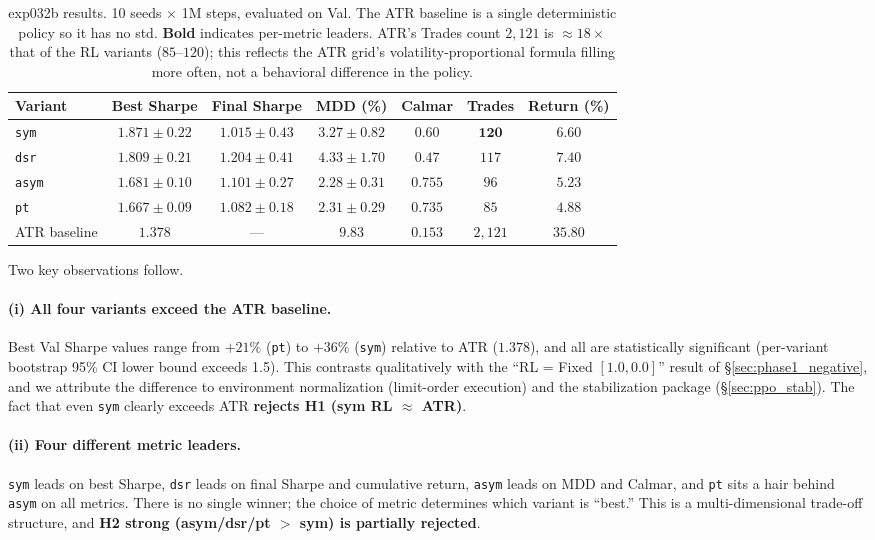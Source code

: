 \documentclass[11pt, a4paper]{article}
\begin{document}
\begin{table}[!htbp]
\centering
\small
\caption{exp032b results. 10 seeds $\times$ 1M steps, evaluated on Val. The
ATR baseline is a single deterministic policy so it has no std.
\textbf{Bold} indicates per-metric leaders. ATR's Trades count $2{,}121$ is
$\approx 18\times$ that of the RL variants ($85$--$120$); this reflects the
ATR grid's volatility-proportional formula filling more often, not a
behavioral difference in the policy.}
\begin{tabular}{lcccccc}
\toprule
Variant & Best Sharpe & Final Sharpe & MDD (\%) & Calmar & Trades & Return (\%) \\
\midrule
\texttt{sym}  & $\mathbf{1.871 \pm 0.22}$ & $1.015 \pm 0.43$ & $3.27 \pm 0.82$ &
$0.60$ & $\mathbf{120}$ & $6.60$ \\
\texttt{dsr}  & $1.809 \pm 0.21$ & $\mathbf{1.204 \pm 0.41}$ & $4.33 \pm 1.70$ &
$0.47$ & $117$ & $\mathbf{7.40}$ \\
\texttt{asym} & $1.681 \pm 0.10$ & $1.101 \pm 0.27$ & $\mathbf{2.28 \pm 0.31}$ &
$\mathbf{0.755}$ & $96$ & $5.23$ \\
\texttt{pt}   & $1.667 \pm 0.09$ & $1.082 \pm 0.18$ & $2.31 \pm 0.29$ &
$0.735$ & $85$ & $4.88$ \\
\midrule
ATR baseline & $1.378$ & --- & $9.83$ & $0.153$ & $2{,}121$ & $35.80$ \\
\bottomrule
\end{tabular}
\label{tab:pareto_metrics}
\end{table}

Two key observations follow.

\paragraph{(i) All four variants exceed the ATR baseline.}
Best Val Sharpe values range from $+21\%$ (\texttt{pt}) to $+36\%$ (\texttt{sym})
relative to ATR ($1.378$), and all are statistically significant
(per-variant bootstrap 95\% CI lower bound exceeds 1.5). This contrasts
qualitatively with the ``RL = Fixed $[1.0, 0.0]$'' result of
\S\ref{sec:phase1_negative}, and we attribute the difference to environment
normalization (limit-order execution) and the stabilization package
(\S\ref{sec:ppo_stab}). The fact that even \texttt{sym} clearly exceeds ATR
\textbf{rejects H1 (sym RL $\approx$ ATR)}.

\paragraph{(ii) Four different metric leaders.}
\texttt{sym} leads on best Sharpe, \texttt{dsr} leads on final Sharpe and
cumulative return, \texttt{asym} leads on MDD and Calmar, and \texttt{pt}
sits a hair behind \texttt{asym} on all metrics. There is no single winner;
the choice of metric determines which variant is ``best.'' This is a
multi-dimensional trade-off structure, and \textbf{H2 strong (asym/dsr/pt $>$
sym) is partially rejected}.
\end{document}
